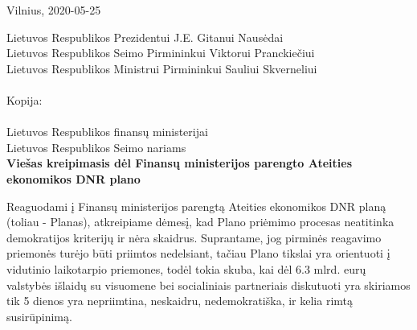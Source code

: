 \documentclass[12pt]{letter}
\begin{document}
\begin{flushright}
Vilnius, 2020-05-25
\end{flushright}

Lietuvos Respublikos Prezidentui J.E. Gitanui Nausėdai\\         
Lietuvos Respublikos Seimo Pirmininkui Viktorui Pranckiečiui\\
Lietuvos Respublikos Ministrui Pirmininkui Sauliui Skverneliui\\
\\
Kopija:\\
\\
Lietuvos Respublikos finansų ministerijai\\
Lietuvos Respublikos Seimo nariams\\

\textbf{Viešas kreipimasis dėl Finansų ministerijos parengto Ateities ekonomikos DNR plano}

Reaguodami į Finansų ministerijos parengtą Ateities ekonomikos DNR planą (toliau - Planas), atkreipiame dėmesį, kad Plano priėmimo procesas neatitinka demokratijos kriterijų ir nėra skaidrus. Suprantame, jog pirminės reagavimo priemonės turėjo būti priimtos nedelsiant, tačiau Plano tikslai yra orientuoti į vidutinio laikotarpio priemones, todėl tokia skuba, kai dėl 6.3 mlrd. eurų valstybės išlaidų su visuomene bei socialiniais partneriais diskutuoti yra skiriamos tik 5 dienos yra nepriimtina, neskaidru, nedemokratiška, ir kelia rimtą susirūpinimą.
\end{document}
